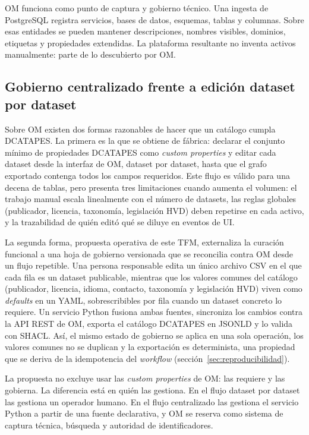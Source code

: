 \ac{OM} funciona como punto de captura y gobierno técnico. Una ingesta de PostgreSQL registra servicios, bases de datos, esquemas, tablas y columnas. Sobre esas entidades se pueden mantener descripciones, nombres visibles, dominios, etiquetas y propiedades extendidas. La plataforma resultante no inventa activos manualmente: parte de lo descubierto por \ac{OM}.

\subsection{Gobierno centralizado frente a edición dataset por dataset}\label{sec:gobierno-centralizado-vs-distribuido}

Sobre \ac{OM} existen dos formas razonables de hacer que un catálogo cumpla \ac{DCATAPES}. La primera es la que se obtiene de fábrica: declarar el conjunto mínimo de propiedades \ac{DCATAPES} como \emph{custom properties} y editar cada dataset desde la interfaz de \ac{OM}, dataset por dataset, hasta que el grafo exportado contenga todos los campos requeridos. Este flujo es válido para una decena de tablas, pero presenta tres limitaciones cuando aumenta el volumen: el trabajo manual escala linealmente con el número de datasets, las reglas globales (publicador, licencia, taxonomía, legislación HVD) deben repetirse en cada activo, y la trazabilidad de quién editó qué se diluye en eventos de \ac{UI}.

La segunda forma, propuesta operativa de este TFM, externaliza la curación funcional a una hoja de gobierno versionada que se reconcilia contra \ac{OM} desde un flujo repetible. Una persona responsable edita un único archivo \ac{CSV} en el que cada fila es un dataset publicable, mientras que los valores comunes del catálogo (publicador, licencia, idioma, contacto, taxonomía y legislación \ac{HVD}) viven como \emph{defaults} en un \ac{YAML}, sobrescribibles por fila cuando un dataset concreto lo requiere. Un servicio Python fusiona ambas fuentes, sincroniza los cambios contra la \ac{API} \ac{REST} de \ac{OM}, exporta el catálogo \ac{DCATAPES} en \ac{JSONLD} y lo valida con \ac{SHACL}. Así, el mismo estado de gobierno se aplica en una sola operación, los valores comunes no se duplican y la exportación es determinista, una propiedad que se deriva de la idempotencia del \emph{workflow} (sección~\ref{sec:reproducibilidad}).

La propuesta no excluye usar las \emph{custom properties} de \ac{OM}: las requiere y las gobierna. La diferencia está en quién las gestiona. En el flujo dataset por dataset las gestiona un operador humano. En el flujo centralizado las gestiona el servicio Python a partir de una fuente declarativa, y \ac{OM} se reserva como sistema de captura técnica, búsqueda y autoridad de identificadores.


